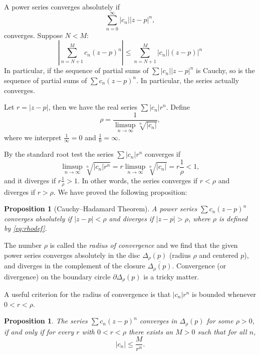\documentclass[12pt,openany]{book}
\newcommand{\sabs}[1]{\lvert {#1} \rvert}
\newcommand{\abs}[1]{\left\lvert {#1} \right\rvert}
\newcommand{\myindex}[1]{#1\index{#1}}
\theoremstyle{plain}
\newtheorem{prop}[thm]{Proposition}
\theoremstyle{remark}
\theoremstyle{definition}
\theoremstyle{exercise}
\theoremstyle{example}
\begin{document}
A power series converges absolutely if
\begin{equation*}
\sum_{n=0}^\infty \sabs{c_n} \sabs{z-p}^n ,
\end{equation*}
converges.  Suppose $N < M$:
\begin{equation*}
\abs{\sum_{n=N+1}^M c_n {(z-p)}^n}
\leq
\sum_{n=N+1}^M \sabs{c_n} \sabs{(z-p)}^n
\end{equation*}
In particular, if the sequence of partial sums of 
$\sum \sabs{c_n} \sabs{z-p}^n$ is Cauchy, so is the sequence
of partial sums of $\sum c_n {(z-p)}^n$.  In particular,
the series actually converges.

Let $r = \sabs{z-p}$, then we have the real series $\sum \sabs{c_n} r^n$.  Define
\begin{equation} \label{eq:rhodef}
\rho = \frac{1}{\limsup\limits_{n \to \infty} \sqrt[n]{\sabs{c_n}}} ,
\end{equation}
where we interpret $\frac{1}{\infty} = 0$ and $\frac{1}{0} = \infty$.

By the standard root test the series $\sum \sabs{c_n} r^n$
converges if
\begin{equation*}
\limsup_{n \to \infty} \sqrt[n]{\sabs{c_n} r^n} = 
r \limsup_{n \to \infty} \sqrt[n]{\sabs{c_n}} = r \frac{1}{\rho} < 1 ,
\end{equation*}
and it diverges if $r \frac{1}{\rho} > 1$.  In other words,
the series converges if
$r < \rho$
and diverges if
$r > \rho$.  We have proved the following proposition:

\begin{prop}[Cauchy--Hadamard Theorem]
A power series $\sum c_n {(z-p)}^n$ converges absolutely if
$\sabs{z-p} < \rho$ and diverges if
$\sabs{z-p} > \rho$, where $\rho$ is defined by \eqref{eq:rhodef}.
\end{prop}

The number $\rho$ is called the \emph{\myindex{radius of convergence}}
and we find that the given power series converges absolutely
in the disc $\Delta_\rho(p)$ (radius $\rho$ and centered $p$), and diverges
in the complement of the closure $\overline{\Delta_\rho(p)}$.
Convergence (or divergence) on the boundary circle $\partial \Delta_\rho(p)$
is a tricky matter.

A useful criterion for the radius of convergence is that $\sabs{c_n} r^n$ is
bounded whenever $0 < r < \rho$.

\begin{prop}
The series $\sum c_n {(z-p)}^n$ converges in $\Delta_{\rho}(p)$ for some
$\rho > 0$, if and only if
for every $r$ with
$0 < r < \rho$ there exists an $M > 0$ such that for all $n$,
\begin{equation*}
\sabs{c_n} \leq \frac{M}{r^n} .
\end{equation*}
\end{prop}
\end{document}
